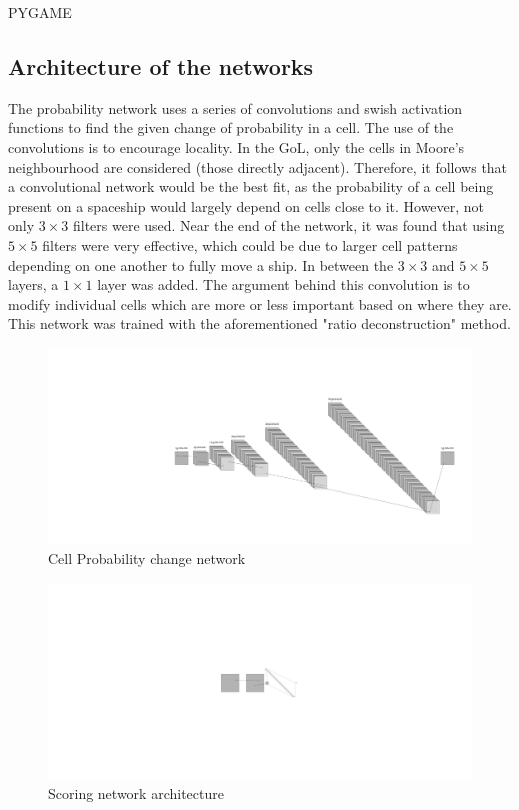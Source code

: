 \documentclass{l4proj}
\begin{document}
PYGAME

\subsection{Architecture of the networks}

The probability network uses a series of convolutions and swish activation functions to find the given change of probability in a cell. The use of the convolutions is to encourage locality. In the GoL, only the cells in Moore's neighbourhood are considered (those directly adjacent). Therefore, it follows that a convolutional network would be the best fit, as the probability of a cell being present on a spaceship would largely depend on cells close to it. However, not only $3 \times 3$ filters were used. Near the end of the network, it was found that using $5 \times 5$ filters were very effective, which could be due to larger cell patterns depending on one another to fully move a ship. In between the $3 \times 3$ and $5 \times 5$ layers, a $1 \times 1$ layer was added. The argument behind this convolution is to modify individual cells which are more or less important based on where they are. This network was trained with the aforementioned "ratio deconstruction" method.

\begin{figure}[h]
\centering
\includegraphics[width=0.8\linewidth]{dissertation/images/diagrams/probability_network_diagram.png}
\caption{Cell Probability change network}
\label{fig:subim1}
\end{figure}
\begin{figure}[h]
\centering
\includegraphics[width=0.8\linewidth]{dissertation/images/diagrams/scoring_network_diagram.png}
\caption{Scoring network architecture}
\label{fig:subim1}
\end{figure}
\end{document}
